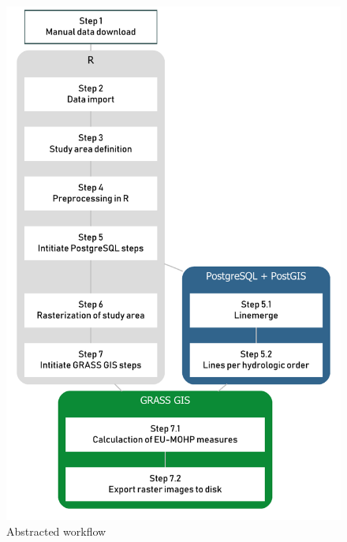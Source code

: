 \documentclass[fleqn,10pt]{wlscirep}
\begin{document}
\begin{figure}[ht]
\centering
\includegraphics[width=0.7\linewidth]{"diagramms/flowchart.pdf"}
\caption{Abstracted workflow}
\label{fig:abstracted_workflow}
\end{figure}
\end{document}
